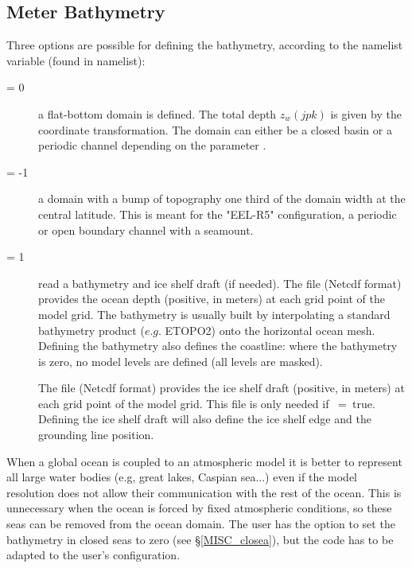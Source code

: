 \documentclass[NEMO_book]{subfiles}
\begin{document}
{%
\subsection{Meter Bathymetry}
\label{DOM_bathy}

Three options are possible for defining the bathymetry, according to the 
namelist variable  (found in  namelist): 
\begin{description}
\item[ = 0] a flat-bottom domain is defined. The total depth $z_w (jpk)$ 
is given by the coordinate transformation. The domain can either be a closed 
basin or a periodic channel depending on the parameter . 
\item[ = -1] a domain with a bump of topography one third of the 
domain width at the central latitude. This is meant for the "EEL-R5" configuration, 
a periodic or open boundary channel with a seamount. 
\item[ = 1] read a bathymetry and ice shelf draft (if needed).
 The  file (Netcdf format) provides the ocean depth (positive, in meters)
 at each grid point of the model grid. The bathymetry is usually built by interpolating a standard bathymetry product 
($e.g.$ ETOPO2) onto the horizontal ocean mesh. Defining the bathymetry also 
defines the coastline: where the bathymetry is zero, no model levels are defined 
(all levels are masked).

The  file (Netcdf format) provides the ice shelf draft (positive, in meters)
 at each grid point of the model grid. This file is only needed if ~=~true. 
Defining the ice shelf draft will also define the ice shelf edge and the grounding line position.
\end{description}

When a global ocean is coupled to an atmospheric model it is better to represent 
all large water bodies (e.g, great lakes, Caspian sea...) even if the model 
resolution does not allow their communication with the rest of the ocean. 
This is unnecessary when the ocean is forced by fixed atmospheric conditions, 
so these seas can be removed from the ocean domain. The user has the option 
to set the bathymetry in closed seas to zero (see \S\ref{MISC_closea}), but the 
code has to be adapted to the user's configuration. 

}
\end{document}
